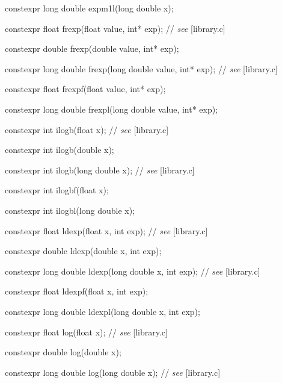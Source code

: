 \documentclass[prd,twocolumn,amsmath,amssymb,nofootinbib,eqsecnum]{revtex4-1}
\newcommand{\highlight}[1]{{\color{red} #1}}
\newcommand{\oldhighlight}[1]{{\color{green} #1}}
\newcommand{\stdcomment}[1]{{// {\it see} [#1]}}
\begin{document}
{\highlight{constexpr} long double expm1l(long double x);

\vspace{2ex}


\oldhighlight{constexpr}  float frexp(float value, int* exp); \stdcomment{library.c}

\oldhighlight{constexpr}  double frexp(double value, int* exp);

\oldhighlight{constexpr}  long double frexp(long double value, int* exp); \stdcomment{library.c}

\oldhighlight{constexpr}  float frexpf(float value, int* exp);

\oldhighlight{constexpr}  long double frexpl(long double value, int* exp);

\vspace{2ex}


\oldhighlight{constexpr} int ilogb(float x); \stdcomment{library.c}

\oldhighlight{constexpr} int ilogb(double x);

\oldhighlight{constexpr} int ilogb(long double x); \stdcomment{library.c}

\oldhighlight{constexpr} int ilogbf(float x);

\oldhighlight{constexpr} int ilogbl(long double x);

\vspace{2ex}


\oldhighlight{constexpr} float ldexp(float x, int exp); \stdcomment{library.c}

\oldhighlight{constexpr} double ldexp(double x, int exp);

\oldhighlight{constexpr} long double ldexp(long double x, int exp); \stdcomment{library.c}

\oldhighlight{constexpr} float ldexpf(float x, int exp);

\oldhighlight{constexpr} long double ldexpl(long double x, int exp);

\vspace{2ex}


\highlight{constexpr} float log(float x); \stdcomment{library.c}

\highlight{constexpr} double log(double x);

\highlight{constexpr} long double log(long double x); \stdcomment{library.c}

}
\end{document}
